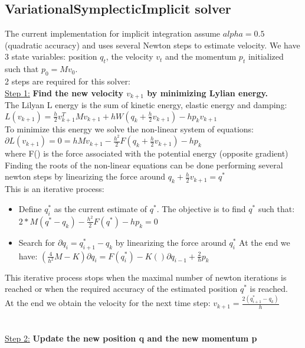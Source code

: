 \documentclass[12pt]{article}
\begin{document}
\begin{doublespace}
\subsection{VariationalSymplecticImplicit solver}
The current implementation for implicit integration assume $alpha=0.5$ (quadratic accuracy) and uses several Newton steps to estimate velocity. We have 3 state variables: position $q_{t}$, the velocity $v_{t}$ and the momentum $p_{t}$ initialized such that $p_{0}=Mv_{0}$.
\\2 steps are required for this solver:
\\ \underline{Step 1:} \textbf{Find the new velocity $v_{k+1}$ by minimizing Lylian energy.}
\\ The Lilyan L energy is the sum of kinetic energy, elastic energy and damping:
$L(v_{k+1})=\frac{h}{2}v_{k+1}^{T}Mv_{k+1} + hW(q_{k}+\frac{h}{2}v_{k+1}) - hp_{k}v_{k+1}$
\\To minimize this energy we solve the non-linear system of equations:
\\$\partial L(v_{k+1}) = 0 = hMv_{k+1} - \frac{h^{2}}{2}F(q_{k}+\frac{h}{2}v_{k+1})-hp_{k}$ \\where F() is the force associated with the potential energy (opposite gradient)
\\ Finding the roots of the non-linear equations can be done performing several newton steps by linearizing the force around $q_{k}+\frac{h}{2}v_{k+1}=q^{*}$
\\ This is an iterative process:
\begin{itemize}
\item Define $ q_{i}^{*}$ as the current estimate of $q^{*}$. The objective is to find $q^{*}$ such that:
$2*M(q^{*}-q_{k})-\frac{h^2}{2}F(q^{*})-hp_{k}=0$
\item Search for $\partial q_{i} = q_{i+1}^{*}-q_{k}$ by linearizing the force around $q_{i}^{*}$ 
At the end we have: $(\frac{4}{h^{2}}M-K) \partial q_{i} = F(q_{i}^{*}) - K()\partial q_{i-1} + \frac{2}{h}p_{k}$
\end{itemize}
This iterative process stops when the maximal number of newton iterations is reached or when the required accuracy of the estimated position $q^{*}$ is reached.
\\ At the end we obtain the velocity for the next time step:
$v_{k+1}=\frac{2(q_{i+1}^{*}-q_{k})}{h}$
\\ \\ \\ \underline{Step 2:} \textbf{Update the new position q and the new momentum p}

\end{doublespace}
\end{document}
